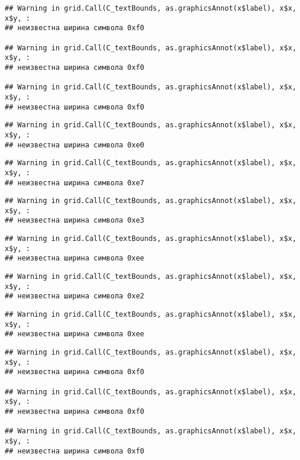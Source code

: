 \documentclass[
]{article}
\begin{document}
\begin{verbatim}
## Warning in grid.Call(C_textBounds, as.graphicsAnnot(x$label), x$x, x$y, :
## неизвестна ширина символа 0xf0

## Warning in grid.Call(C_textBounds, as.graphicsAnnot(x$label), x$x, x$y, :
## неизвестна ширина символа 0xf0

## Warning in grid.Call(C_textBounds, as.graphicsAnnot(x$label), x$x, x$y, :
## неизвестна ширина символа 0xf0
\end{verbatim}

\begin{verbatim}
## Warning in grid.Call(C_textBounds, as.graphicsAnnot(x$label), x$x, x$y, :
## неизвестна ширина символа 0xe0
\end{verbatim}

\begin{verbatim}
## Warning in grid.Call(C_textBounds, as.graphicsAnnot(x$label), x$x, x$y, :
## неизвестна ширина символа 0xe7
\end{verbatim}

\begin{verbatim}
## Warning in grid.Call(C_textBounds, as.graphicsAnnot(x$label), x$x, x$y, :
## неизвестна ширина символа 0xe3
\end{verbatim}

\begin{verbatim}
## Warning in grid.Call(C_textBounds, as.graphicsAnnot(x$label), x$x, x$y, :
## неизвестна ширина символа 0xee
\end{verbatim}

\begin{verbatim}
## Warning in grid.Call(C_textBounds, as.graphicsAnnot(x$label), x$x, x$y, :
## неизвестна ширина символа 0xe2
\end{verbatim}

\begin{verbatim}
## Warning in grid.Call(C_textBounds, as.graphicsAnnot(x$label), x$x, x$y, :
## неизвестна ширина символа 0xee
\end{verbatim}

\begin{verbatim}
## Warning in grid.Call(C_textBounds, as.graphicsAnnot(x$label), x$x, x$y, :
## неизвестна ширина символа 0xf0

## Warning in grid.Call(C_textBounds, as.graphicsAnnot(x$label), x$x, x$y, :
## неизвестна ширина символа 0xf0

## Warning in grid.Call(C_textBounds, as.graphicsAnnot(x$label), x$x, x$y, :
## неизвестна ширина символа 0xf0
\end{verbatim}
\end{document}
